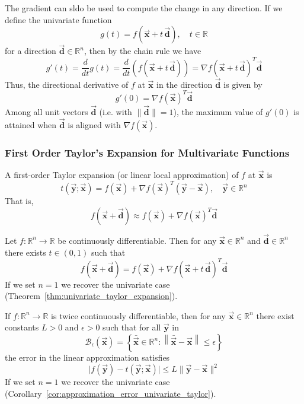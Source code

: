 \documentclass[9pt, headings=standardclasses, parskip=half]{scrartcl}
\renewcommand{\emph}[1]{\textcolor{mypurple}{#1}}
\newcommand{\vect}[1]{\vec{\boldsymbol{#1}}}
\begin{document}

The gradient can sldo be used to compute the change in any direction. If we define the univariate function
\[
g(t)=f\left(\vect{x}+t\,\vect{d}\right), \quad t\in\mathbb{R}%
\]
for a direction \(\vect{d}\in\mathbb{R}^{n}\), then by the chain rule we have
\[
g'(t) = \frac{d}{dt}g(t) = \frac{d}{dt}\left(f\left(\vect{x}+t\,\vect{d}\right)\right) = \nabla f\left(\vect{x}+t\,\vect{d}\right)^{T}\vect{d}
\]
Thus, the \hypertarget{directional_derivative}{\emph{directional derivative}} of \(f\) at \(\vect{x}\) in the direction \(\vect{d}\) is given by
\[
g'(0)=\nabla f(\vect{x})^{T}\vect{d}
\]
Among all unit vectors \(\vect{d}\) (i.e. with \(\|\vect{d}\|=1\)), the maximum value of \(g'(0)\) is attained when \(\vect{d}\) is aligned with \(\nabla f(\vect{x})\).

\subsubsection{First Order Taylor's Expansion for Multivariate Functions}
A first-order Taylor expansion (or linear local approximation) of \(f\) at \(\vect{x}\) is
\[
t(\vect{y};\vect{x})=f(\vect{x})+\nabla f(\vect{x})^{T}(\vect{y}-\vect{x}),\quad \vect{y}\in\mathbb{R}^{n}
\]
That is,
\[
f(\vect{x}+\vect{d})\approx f(\vect{x})+\nabla f(\vect{x})^{T}\vect{d}
\]

\begin{theorem}
\label{thm:taylor_multivariate_first_order}
Let \(f:\mathbb{R}^{n}\to\mathbb{R}\) be continuously differentiable. Then for any \(\vect{x}\in\mathbb{R}^{n}\) and \(\vect{d}\in\mathbb{R}^{n}\) there exists \(t\in(0,1)\) such that
\[
f(\vect{x}+\vect{d})=f(\vect{x})+\nabla f(\vect{x}+t\,\vect{d})^{T}\vect{d}
\]
If we set \(n=1\) we recover the univariate case (Theorem~\ref{thm:univariate_taylor_expansion}).
\end{theorem}

\begin{corollary}
\label{cor:taylor_error_multivariate_first_order}
If \(f:\mathbb{R}^{n}\to\mathbb{R}\) is twice continuously differentiable, then for any \(\vect{x}\in\mathbb{R}^{n}\) there exist constants \(L>0\) and \(\epsilon>0\) such that for all \(\vect{y}\) in
\[
\mathcal{B}_{\epsilon}\left(\vect{x}\right)=\left\{\bar{\vect{x}}\in\mathbb{R}^{n}:\left\|\bar{\vect{x}}-\vect{x}\right\|\le\epsilon\right\}
\]
the error in the linear approximation satisfies
\[
\bigl|f(\vect{y})-t(\vect{y};\vect{x})\bigr|\le L\|\vect{y}-\vect{x}\|^{2}
\]
If we set \(n=1\) we recover the univariate case (Corollary~\ref{cor:approximation_error_univariate_taylor}).
\end{corollary}
\end{document}
